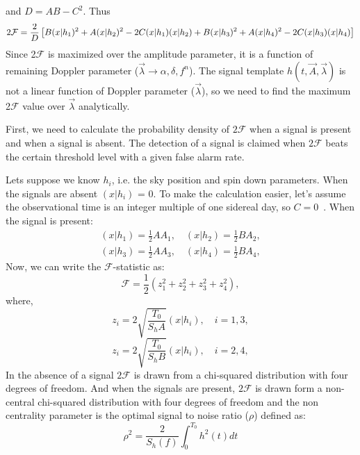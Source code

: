 \documentclass{ttuthes2007}
\begin{document}
and $D=AB-C^2$. Thus
\begin{equation}
\small
2\mathcal{F}=\frac{2}{D}\left[B(x|h_1)^2 + A(x|h_2)^2 -2C(x|h_1)(x|h_2)+
B(x|h_3)^2 + A(x|h_4)^2 -2C(x|h_3)(x|h_4)\right]
\end{equation}
Since 2$\mathcal{F}$ is maximized over the amplitude parameter, it is a
function of remaining Doppler parameter ($\vec{\lambda}\rightarrow \alpha,\delta,f^n$). The signal
template $h(t,\vec{A},\vec{\lambda})$ is not a linear function of Doppler
parameter ($\vec{\lambda}$), so we need to find the maximum 2$\mathcal{F}$ value over
$\vec{\lambda}$ analytically. 

First, we need to calculate the probability density of $2\mathcal{F}$ when a
signal is present and when a signal is absent. The detection of a signal is claimed
when $2\mathcal{F}$ beats the certain threshold level with a given false alarm
rate. 

Lets suppose we know $h_i$, i.e. the sky position and spin down parameters. When
the signals are absent $(x|h_i)$ = 0. To make the calculation easier, let's
assume the observational time is an integer multiple of one sidereal day, so $C
= 0$~\cite{Jaranowski_2000}. When the signal is present:
\begin{align*}
(x|h_1)= \frac{1}{2}AA_1, \quad (x|h_2) = \frac{1}{2}B A_2,\\
(x|h_3)= \frac{1}{2}AA_3, \quad (x|h_4) = \frac{1}{2}B A_4,
\end{align*}
Now, we can write the $\mathcal{F}$-statistic as:
\begin{equation}
\mathcal{F} = \frac{1}{2}(z_1^2+z_2^2+z_3^2+z_4^2),
\end{equation}
where,
\begin{equation}
z_i=2\sqrt{\frac{T_0}{S_hA}}(x|h_i), \quad i=1,3,
\end{equation}
\begin{equation}
z_i=2\sqrt{\frac{T_0}{S_hB}}(x|h_i), \quad i=2,4,
\end{equation}
In the absence of a signal $2\mathcal{F}$ is drawn from a chi-squared distribution with four
degrees of freedom. And when the signals are present, $2\mathcal{F}$ is
drawn form a
non-central chi-squared distribution with four degrees of freedom and the non
centrality parameter is the optimal signal to noise ratio ($\rho$) defined as:
\begin{equation}
\rho^2=\frac{2}{S_h(f)}\int_0^{T_0} h^2(t)dt
\end{equation}
\end{document}
